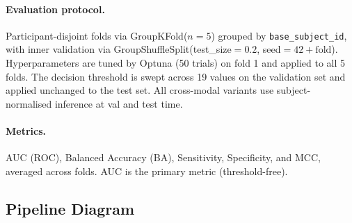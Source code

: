 \documentclass[sigconf,anonymous=false]{acmart}
\begin{document}
\paragraph{Evaluation protocol.}
Participant-disjoint folds via GroupKFold($n=5$) grouped by
\texttt{base\_subject\_id}, with inner validation via
GroupShuffleSplit(test\_size$=0.2$, seed$=42+\text{fold}$).
Hyperparameters are tuned by Optuna (50 trials) on fold 1 and applied to
all 5 folds.  The decision threshold is swept across 19 values on the
validation set and applied unchanged to the test set.
All cross-modal variants use subject-normalised inference at val and test time.

\paragraph{Metrics.}
AUC (ROC), Balanced Accuracy (BA), Sensitivity, Specificity, and MCC,
averaged across folds.  AUC is the primary metric (threshold-free).

\subsection{Pipeline Diagram}
\label{sec:diagram}
\end{document}
